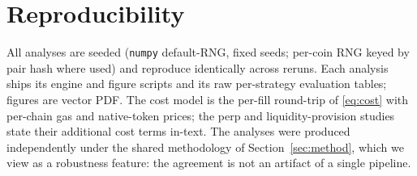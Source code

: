 \documentclass[12pt]{article}
\begin{document}
\section{Reproducibility}\label{app:repro}
All analyses are seeded (\texttt{numpy} default-RNG, fixed seeds; per-coin RNG keyed by pair hash where used) and reproduce identically across reruns. Each analysis ships its engine and figure scripts and its raw per-strategy evaluation tables; figures are vector PDF. The cost model is the per-fill round-trip of \eqref{eq:cost} with per-chain gas and native-token prices; the perp and liquidity-provision studies state their additional cost terms in-text. The analyses were produced independently under the shared methodology of Section~\ref{sec:method}, which we view as a robustness feature: the agreement is not an artifact of a single pipeline.
\end{document}
